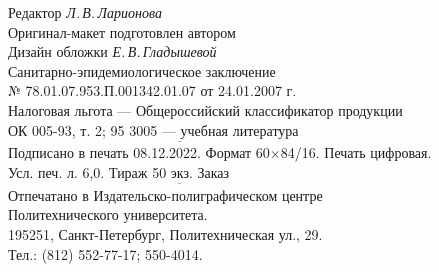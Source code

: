 \documentclass[a5paper,openany]{book}
\newcommand{\ov}{\overline}
\begin{document}
\begin{center}
	Редактор \emph{Л.\,В.\,Ларионова} \\
	Оригинал-макет подготовлен автором\\
	Дизайн обложки \emph{Е.\,В.\,Гладышевой}\\
	\hfill \break	
	Санитарно-эпидемиологическое заключение\\
	№ 78.01.07.953.П.001342.01.07 от 24.01.2007 г. \\
	\hfill \break	
	Налоговая льгота --- Общероссийский классификатор продукции \\
	ОК 005-93, т. 2; 95 3005 --- учебная литература\\
	$\ov{~~~~~~~~~~~~~~~~~~~~~~~~~~~~~~~~~~~~~~~~~~~~~~~~~~~~~~~~~~~~~~~~~~~~~~~~~~~~~~~~~~~~~~~~~~~~~~~~~~~~~~~~~~~~~~~}$\\
	Подписано в печать 08.12.2022. Формат 60$\times$84/16. Печать цифровая. \\
	Усл. печ. л. 6,0. Тираж 50 экз. Заказ ~~~~ \\
	$\ov{~~~~~~~~~~~~~~~~~~~~~~~~~~~~~~~~~~~~~~~~~~~~~~~~~~~~~~~~~~~~~~~~~~~~~~~~~~~~~~~~~~~~~~~~~~~~~~~~~~~~~~~~~~~~~~~}$\\ 
	Отпечатано в Издательско-полиграфическом центре \\
	Политехнического университета. \\
	195251, Санкт-Петербург, Политехническая ул., 29. \\
	Тел.: (812) 552-77-17; 550-4014.
	
\end{center}


\thispagestyle{empty} %
\end{document}
